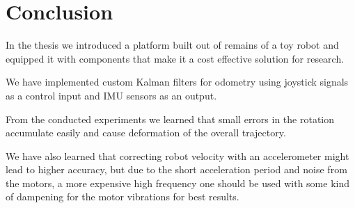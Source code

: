 \documentclass[class=report, crop=false]{standalone}
\begin{document}
\chapter{Conclusion}\label{cha:conclusion}

In the thesis we introduced a platform built out of remains of a toy robot and equipped it with components that make it a cost effective solution for research.

We have implemented custom Kalman filters for odometry using joystick signals as a control input and IMU sensors as an output.

From the conducted experiments we learned that small errors in the rotation accumulate easily and cause deformation of the overall trajectory.

We have also learned that correcting robot velocity with an accelerometer might lead to higher accuracy, but due to the short acceleration period and noise from the motors, a more expensive high frequency one should be used with some kind of dampening for the motor vibrations for best results.
\end{document}
